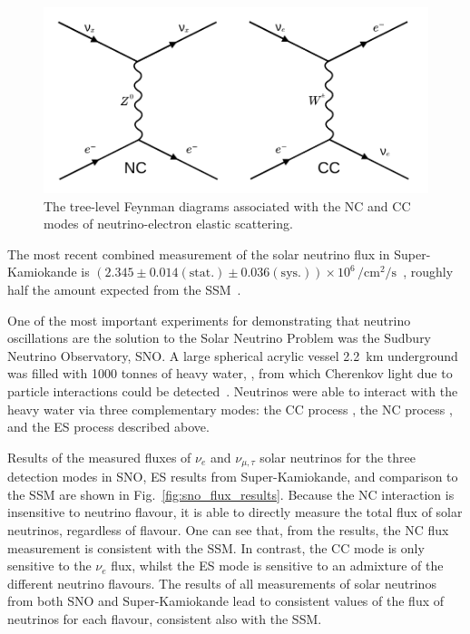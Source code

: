 \begin{figure}
    \centering
    \includegraphics[width=\textwidth]{1_NeutrinoTheory/Figs/feynman_diag_nu_e_es.pdf}
    \caption[The two tree-level Feynman diagrams associated with neutrino-electron elastic scattering]
    {The tree-level Feynman diagrams associated with the NC and CC modes of neutrino-electron elastic scattering.}
    \label{fig:nu_e_es_feynman_diagrams}
\end{figure}


The most recent combined measurement of the \beight{} solar neutrino flux in Super-Kamiokande is $(2.345\pm0.014(\mathrm{stat.})\pm0.036(\mathrm{sys.}))\times10^{6}\,\si{\per\cm\squared\per\second}$~\cite{abeSolarNeutrinoMeasurements2016}, roughly half the amount expected from the SSM~\cite{vinyolesB16StandardSolar2018}.

One of the most important experiments for demonstrating that neutrino oscillations are the solution to the Solar Neutrino Problem was the Sudbury Neutrino Observatory, SNO. A large spherical acrylic vessel \SI{2.2}{\km} underground was filled with \num{1000} tonnes of heavy water, , from which Cherenkov light due to particle interactions could be detected~\cite{BOGER2000172}. Neutrinos were able to interact with the heavy water via three complementary modes: the CC process , the NC process , and the ES process described above.

Results of the measured fluxes of $\nu_{e}$ and $\nu_{\mu,\tau}$ solar neutrinos for the three detection modes in SNO, ES results from Super-Kamiokande, and comparison to the SSM are shown in Fig.~\ref{fig:sno_flux_results}. Because the NC interaction is insensitive to neutrino flavour, it is able to directly measure the total flux of \beight{} solar neutrinos, regardless of flavour. One can see that, from the results, the NC flux measurement is consistent with the SSM. In contrast, the CC mode is only sensitive to the $\nu_{e}$ flux, whilst the ES mode is sensitive to an admixture of the different neutrino flavours. The results of all measurements of solar neutrinos from both SNO and Super-Kamiokande lead to consistent values of the flux of \beight{} neutrinos for each flavour, consistent also with the SSM.

